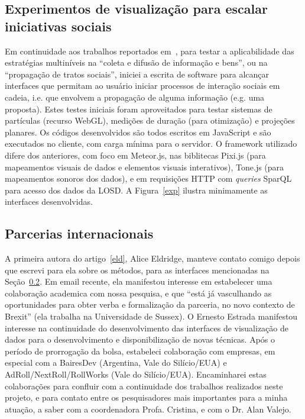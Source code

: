 \documentclass[a4paper, 11pt]{article}
\begin{document}
\subsection{Experimentos de visualização para escalar iniciativas sociais}
Em continuidade aos trabalhos reportados em~\cite{tese,virus},
para testar a aplicabilidade das estratégias multiníveis na ``coleta e difusão de informação e bens'',
ou na ``propagação de tratos sociais'', iniciei a escrita de software para alcançar interfaces
que permitam ao usuário iniciar processos de interação sociais em cadeia, i.e. que envolvem
a propagação de alguma informação (e.g. uma proposta).
Estes testes iniciais foram aproveitados para testar sistemas de partículas (recurso WebGL),
medições de duração (para otimização) e projeções planares.
Os códigos desenvolvidos são todos escritos em JavaScript e são executados no cliente,
com carga mínima para o servidor.
O framework utilizado difere dos anteriores, com foco em Meteor.js,
nas biblitecas Pixi.js (para mapeamentos visuais de dados e elementos visuais interativos),
Tone.js (para mapeamentos sonoros dos dados),
e em requisições HTTP com \emph{queries} SparQL para acesso dos dados da LOSD.
A Figura~\ref{exp} ilustra minimamente as interfaces desenvolvidas.

\subsection{Parcerias internacionais}
A primeira autora do artigo~\ref{eld}, Alice Eldridge,
manteve contato comigo depois que escrevi para ela sobre
os métodos, para as interfaces mencionadas na Seção~\ref{}.
Em email recente, ela manifestou interesse em
estabelecer uma colaboração academica com nossa pesquisa, e que ``está já
vasculhando as oportunidades para obter verba e formalização da parceria,
no novo contexto de Brexit'' (ela trabalha na Universidade de Sussex).
O Ernesto Estrada manifestou interesse na continuidade do desenvolvimento
das interfaces de visualização de dados para o desenvolvimento e disponibilização
de novas técnicas.
Após o período de prorrogação da bolsa, estabeleci colaboração
com empresas, em especial com a BairesDev (Argentina, Vale do Silício/EUA) e
AdRoll/NextRoll/RollWorks (Vale do Silício/EUA). 
Encaminharei estas colaborações para confluir com a continuidade dos
trabalhos realizados neste projeto, e para contato entre os pesquisadores
mais importantes para a minha atuação, a saber com a coordenadora Profa. Cristina,
e com o Dr. Alan Valejo.
\end{document}
